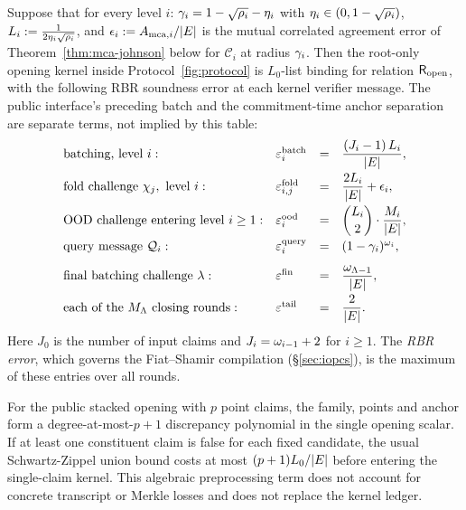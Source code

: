 \begin{theorem}\label{thm:rbr}
Suppose that for every level $i$: $\gamma_i=1-\sqrt{\rho_i}-\eta_i$ with $\eta_i\in(0,1-\sqrt{\rho_i})$, $L_i:=\tfrac{1}{2\eta_i\sqrt{\rho_i}}$, and $\epsilon_i:=A_{\mathrm{mca},i}/|E|$ is the mutual correlated agreement error of Theorem~\ref{thm:mca-johnson} below for $\mathcal{C}_i$ at radius $\gamma_i$. Then the root-only opening kernel inside Protocol~\ref{fig:protocol} is $L_0$-list binding for relation $\mathsf{R}_{\mathrm{open}}$, with the following RBR soundness error at each kernel verifier message. The public interface's preceding batch and the commitment-time anchor separation are separate terms, not implied by this table:
\[
\begin{array}{llcl}
\textnormal{batching, level } i: & \varepsilon^{\mathrm{batch}}_i &=& \dfrac{(J_i - 1)\, L_i}{|E|} , \\[2ex]
\textnormal{fold challenge } \chi_j, \textnormal{ level } i: & \varepsilon^{\mathrm{fold}}_{i,j} &=& \dfrac{2 L_i}{|E|} + \epsilon_i , \\[2ex]
\textnormal{OOD challenge entering level } i \ge 1: & \varepsilon^{\mathrm{ood}}_i &=& \dbinom{L_i}{2} \cdot \dfrac{M_i}{|E|} , \\[2ex]
\textnormal{query message } \mathcal{Q}_i: & \varepsilon^{\mathrm{query}}_i &=& (1 - \gamma_i)^{\omega_i} , \\[2ex]
\textnormal{final batching challenge } \lambda: & \varepsilon^{\mathrm{fin}} &=& \dfrac{\omega_{\Lambda-1}}{|E|} , \\[2ex]
\textnormal{each of the } M_\Lambda \textnormal{ closing rounds}: & \varepsilon^{\mathrm{tail}} &=& \dfrac{2}{|E|} .
\end{array}
\]
Here $J_0$ is the number of input claims and $J_i = \omega_{i-1} + 2$ for $i \ge 1$. The \emph{RBR error}, which governs the Fiat--Shamir compilation (\S\ref{sec:iopcs}), is the maximum of these entries over all rounds.
\end{theorem}

For the public stacked opening with $p$ point claims, the family, points and anchor form a degree-at-most-$p+1$ discrepancy polynomial in the single opening scalar. If at least one constituent claim is false for each fixed candidate, the usual Schwartz-Zippel union bound costs at most $(p+1)L_0/|E|$ before entering the single-claim kernel. This algebraic preprocessing term does not account for concrete transcript or Merkle losses and does not replace the kernel ledger.

